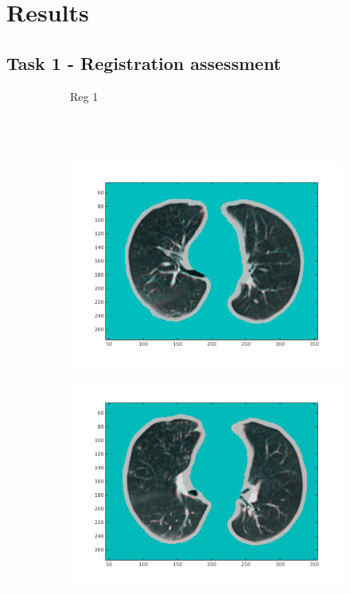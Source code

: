 \documentclass[11pt,a4paper,oneside]{report}
\begin{document}
\section*{Results}

\subsection*{Task 1 - Registration assessment}

\begin{figure}[H]
  \centering
  \begin{subfigure}[b]{0.1\textwidth}
    Reg 1\\\\\\\\
  \end{subfigure}%
  \hspace*{-1.9em}
  \begin{subfigure}[b]{0.3\textwidth}
	  \includegraphics[width=\textwidth, trim=20 20 20 20]{figures/reg1/reg1_1_66.png}
  \end{subfigure}%
  \begin{subfigure}[b]{0.3\textwidth}
	  \includegraphics[width=\textwidth, trim=20 20 20 20]{figures/reg1/reg2_5_60.png}

\end{subfigure}
\end{figure}
\end{document}
